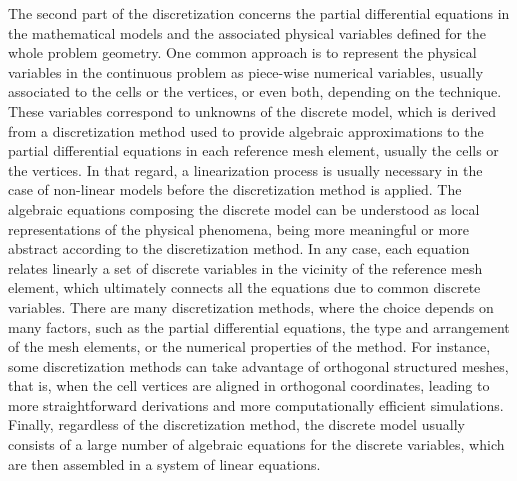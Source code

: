 The second part of the discretization concerns the partial differential equations in the mathematical models and the associated physical variables defined for the whole problem geometry.
One common approach is to represent the physical variables in the continuous problem as piece-wise numerical variables, usually associated to the cells or the vertices, or even both, depending on the technique.
These variables correspond to unknowns of the discrete model, which is derived from a discretization method used to provide algebraic approximations to the partial differential equations in each reference mesh element, usually the cells or the vertices.
In that regard, a linearization process is usually necessary in the case of non-linear models before the discretization method is applied.
The algebraic equations composing the discrete model can be understood as local representations of the physical phenomena, being more meaningful or more abstract according to the discretization method.
In any case, each equation relates linearly a set of discrete variables in the vicinity of the reference mesh element, which ultimately connects all the equations due to common discrete variables.
There are many discretization methods, where the choice depends on many factors, such as the partial differential equations, the type and arrangement of the mesh elements, or the numerical properties of the method.
For instance, some discretization methods can take advantage of orthogonal structured meshes, that is, when the cell vertices are aligned in orthogonal coordinates, leading to more straightforward derivations and more computationally efficient simulations.
Finally, regardless of the discretization method, the discrete model usually consists of a large number of algebraic equations for the discrete variables, which are then assembled in a system of linear equations.

